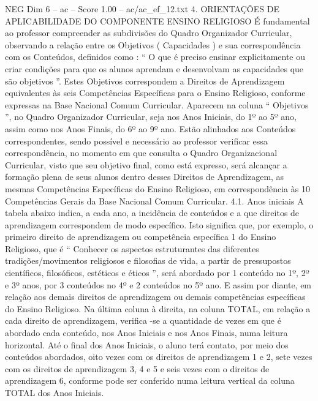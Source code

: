 \begin{textsample}{NEG Dim 6 – ac – Score 1.00 – ac/ac\_ef\_12.txt}  \label{ex:f6_neg_131}
4.
ORIENTAÇÕES DE APLICABILIDADE DO COMPONENTE ENSINO RELIGIOSO É fundamental ao professor compreender as subdivisões do Quadro Organizador Curricular, observando a relação entre os Objetivos ( Capacidades ) e sua correspondência com os Conteúdos, definidos como : “ O que é preciso ensinar explicitamente ou criar condições para que os alunos aprendam e desenvolvam as capacidades que são objetivos ”.
Estes Objetivos correspondem a Direitos de Aprendizagem equivalentes às seis Competências Específicas para o Ensino Religioso, conforme expressas na Base Nacional Comum Curricular.
Aparecem na coluna “ Objetivos ”, no Quadro Organizador Curricular, seja nos Anos Iniciais, do 1º ao 5º ano, assim como nos Anos Finais, do 6º ao 9º ano.
Estão alinhados aos Conteúdos correspondentes, sendo possível e necessário ao professor verificar essa correspondência, no momento em que consulta o Quadro Organizacional Curricular, visto que seu objetivo final, como está expresso, será alcançar a formação plena de seus alunos dentro desses Direitos de Aprendizagem, as mesmas Competências Específicas do Ensino Religioso, em correspondência às 10 Competências Gerais da Base Nacional Comum Curricular. 4.1.
Anos iniciais A tabela abaixo indica, a cada ano, a incidência de conteúdos e a que direitos de aprendizagem correspondem de modo específico.
Isto significa que, por exemplo, o primeiro direito de aprendizagem ou competência específica 1 do Ensino Religioso, que é “ Conhecer os aspectos estruturantes das diferentes tradições/movimentos religiosos e filosofias de vida, a partir de pressupostos científicos, filosóficos, estéticos e éticos ”, será abordado por 1 conteúdo no 1º, 2º e 3º anos, por 3 conteúdos no 4º e 2 conteúdos no 5º ano.
E assim por diante, em relação aos demais direitos de aprendizagem ou demais competências específicas do Ensino Religioso.
Na última coluna à direita, na coluna TOTAL, em relação a cada direito de aprendizagem, verifica -se a quantidade de vezes em que é abordado cada conteúdo, nos Anos Iniciais e nos Anos Finais, numa leitura horizontal.
Até o final dos Anos Iniciais, o aluno terá contato, por meio dos conteúdos abordados, oito vezes com os direitos de aprendizagem 1 e 2, sete vezes com os direitos de aprendizagem 3, 4 e 5 e seis vezes com o direitos de aprendizagem 6, conforme pode ser conferido numa leitura vertical da coluna TOTAL dos Anos Iniciais.

\end{textsample}
